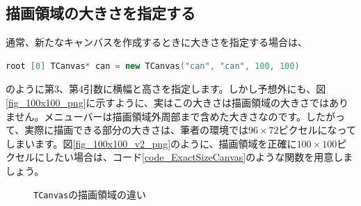 \subsection{描画領域の大きさを指定する}
通常、新たなキャンバスを作成するときに大きさを指定する場合は、
\begin{lstlisting}[language=C++]
root [0] TCanvas* can = new TCanvas("can", "can", 100, 100)
\end{lstlisting}
のように第3、第4引数に横幅と高さを指定します。しかし予想外にも、図\ref{fig_100x100_png}に示すように、実はこの大きさは描画領域の大きさではありません。メニューバーは描画領域外周部まで含めた大きさなのです。したがって、実際に描画できる部分の大きさは、筆者の環境では$96\times72$ピクセルになってしまいます。図\ref{fig_100x100_v2_png}のように、描画領域を正確に$100\times100$ピクセルにしたい場合は、コード\ref{code_ExactSizeCanvas}のような関数を用意しましょう。

\begin{figure}
  \centering
  \hfil
  \caption{\texttt{TCanvas}の描画領域の違い}
\end{figure}

\begin{NoFloat}

\end{NoFloat}

